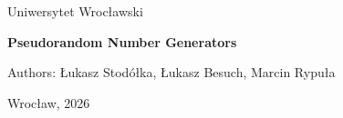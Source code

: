 \begin{titlepage}
\centering
\vspace*{2cm}
{\Large Uniwersytet Wrocławski\par}
\vspace{2.5cm}
{\Huge\bfseries Pseudorandom Number Generators\par}
\vspace{2cm}
{\large Authors: Łukasz Stodółka, Łukasz Besuch, Marcin Rypuła\par}
\vfill
{\large Wrocław, 2026\par}
\end{titlepage}

